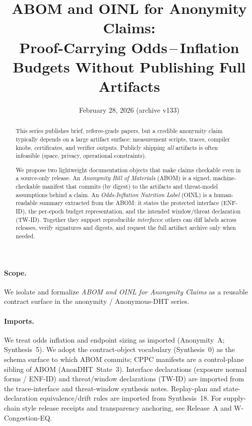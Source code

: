 \documentclass[11pt]{article}
\title{ABOM and OINL for Anonymity Claims:\\
Proof-Carrying Odds\,--\,Inflation Budgets Without Publishing Full Artifacts}
\author{}
\date{February 28, 2026 (archive v133)}
\begin{document}
\maketitle

\begin{abstract}
This series publishes brief, referee-grade papers, but a credible anonymity claim typically depends on a large artifact surface: measurement scripts, traces, compiler knobs, certificates, and verifier outputs.
Publicly shipping \emph{all} artifacts is often infeasible (space, privacy, operational constraints).

We propose two lightweight documentation objects that make claims checkable even in a source-only release.
An \emph{Anonymity Bill of Materials} (ABOM) is a signed, machine-checkable manifest that commits (by digest) to the artifacts and threat-model assumptions behind a claim.
An \emph{Odds-Inflation Nutrition Label} (OINL) is a human-readable summary extracted from the ABOM: it states the protected interface (ENF-ID), the per-epoch budget representation, and the intended window/threat declaration (TW-ID).
Together they support reproducible \emph{interfaces}: others can diff labels across releases, verify signatures and digests, and request the full artifact archive only when needed.
\end{abstract}

\paragraph{Scope.}
We isolate and formalize \emph{ABOM and OINL for Anonymity Claims} as a reusable contract surface in the anonymity / Anonymous-DHT series.

\paragraph{Imports.}
We treat odds inflation and endpoint sizing as imported (Anonymity~A; Synthesis~5).\cite{series:oddsinflation,series:endpointbridge}
We adopt the contract-object vocabulary (Synthesis~0) as the schema surface to which ABOM commits; CPPC manifests are a control-plane sibling of ABOM (AnonDHT~State~3).\cite{series:contractobjects,series:state3}
Interface declarations (exposure normal forms / ENF-ID) and threat/window declarations (TW-ID) are imported from the trace-interface and threat-window synthesis notes.\cite{series:traceifaces,series:threatwindows}
Replay-plan and state-declaration equivalence/drift rules are imported from Synthesis~18.\cite{series:planstateequiv}
For supply-chain style release receipts and transparency anchoring, see Release~A and W-Congestion-EQ.\cite{series:releaseproperty,series:wcongeq}
\end{document}
